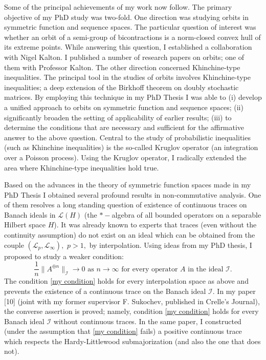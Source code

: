 \documentclass[12pt]{article}
\begin{document}
Some of the principal achievements of my work now follow.  The primary objective of my PhD study was two-fold. One direction was studying orbits in symmetric function and sequence spaces. The particular question of interest was whether an orbit of a semi-group of bicontractions is a norm-closed convex hull of its extreme points. While answering this question, I established a collaboration with Nigel Kalton. I published a number of research papers on orbits; one of them with Professor Kalton. The other direction concerned Khinchine-type inequalities. The principal tool in the studies of orbits involves Khinchine-type inequalities; a deep extension of the Birkhoff theorem on doubly stochastic matrices. By employing this technique in my PhD Thesis I was able to (i) develop a unified approach to orbits on symmetric function and sequence spaces; (ii) significantly broaden the setting of applicability of earlier results; (iii) to determine the conditions that are necessary and sufficient for the affirmative answer to the above question. Central to the study of probabilistic inequalities (such as Khinchine inequalities) is the so-called Kruglov operator (an integration over a Poisson process). Using the Kruglov operator, I radically extended the area where Khinchine-type inequalities hold true.

Based on the advances in the theory of symmetric function spaces made in my PhD Thesis I obtained several profound results in non-commutative analysis. One of them resolves a long standing question of existence of continuous traces on Banach ideals in $\mathcal{L}(H)$ (the $*-$algebra of all bounded operators on a separable Hilbert space $H$). It was already known to experts that traces (even without the continuity assumption) do not exist on an ideal which can be obtained from the couple $(\mathcal{L}_p,\mathcal{L}_{\infty}),$ $p>1,$ by interpolation. Using ideas from my PhD thesis, I proposed to study a weaker condition:
\begin{equation}\label{my condition}
\frac1n\|A^{\oplus n}\|_{\mathcal{I}}\to0\mbox{ as }n\to\infty\mbox{ for every operator }A\mbox{ in the ideal }\mathcal{I}.
\end{equation}
The condition \eqref{my condition} holds for every interpolation space as above and prevents the existence of a continuous trace on the Banach ideal $\mathcal{I}.$ In my paper [10] (joint with my former supervisor F. Sukochev, published in Crelle's Journal), the converse assertion is proved; namely, condition \eqref{my condition} holds for every Banach ideal $\mathcal{I}$ without continuous traces. In the same paper, I constructed (under the assumption that \eqref{my condition} fails) a positive continuous trace which respects the Hardy-Littlewood submajorization (and also the one that does not). 
\end{document}
